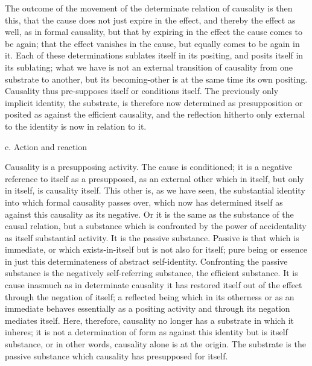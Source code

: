 The outcome of the movement of the
determinate relation of causality is then this,
that the cause does not just expire in the effect,
and thereby the effect as well, as in formal causality,
but that by expiring in the effect
the cause comes to be again;
that the effect vanishes in the cause,
but equally comes to be again in it.
Each of these determinations
sublates itself in its positing,
and posits itself in its sublating;
what we have is not an external
transition of causality from one substrate to another,
but its becoming-other is at the same time its own positing.
Causality thus pre-supposes itself or conditions itself.
The previously only implicit identity, the substrate,
is therefore now determined as presupposition
or posited as against the efficient causality,
and the reflection hitherto only external to
the identity is now in relation to it.

c. Action and reaction

Causality is a presupposing activity.
The cause is conditioned;
it is a negative reference
to itself as a presupposed,
as an external other which in itself,
but only in itself, is causality itself.
This other is, as we have seen,
the substantial identity into which
formal causality passes over,
which now has determined itself
as against this causality as its negative.
Or it is the same as the substance
of the causal relation,
but a substance which is confronted by
the power of accidentality
as itself substantial activity.
It is the passive substance.
Passive is that which is immediate,
or which exists-in-itself
but is not also for itself;
pure being or essence in just
this determinateness of abstract self-identity.
Confronting the passive substance is
the negatively self-referring substance,
the efficient substance.
It is cause inasmuch as in determinate causality
it has restored itself out of the effect
through the negation of itself;
a reflected being which in its otherness
or as an immediate behaves essentially
as a positing activity
and through its negation mediates itself.
Here, therefore, causality no longer has
a substrate in which it inheres;
it is not a determination of form
as against this identity
but is itself substance,
or in other words, causality alone is at the origin.
The substrate is the passive substance
which causality has presupposed for itself.

